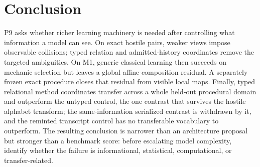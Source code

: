 \section{Conclusion}

P9 asks whether richer learning machinery is needed after controlling what information a model can see. On exact hostile pairs, weaker views impose observable collisions; typed relation and admitted-history coordinates remove the targeted ambiguities. On M1, generic classical learning then succeeds on mechanic selection but leaves a global affine-composition residual. A separately frozen exact procedure closes that residual from visible local maps. Finally, typed relational method coordinates transfer across a whole held-out procedural domain and outperform the untyped control, the one contrast that survives the hostile alphabet transform; the same-information serialized contrast is withdrawn by it, and the reminted transcript control has no transferable vocabulary to outperform. The resulting conclusion is narrower than an architecture proposal but stronger than a benchmark score: before escalating model complexity, identify whether the failure is informational, statistical, computational, or transfer-related.

